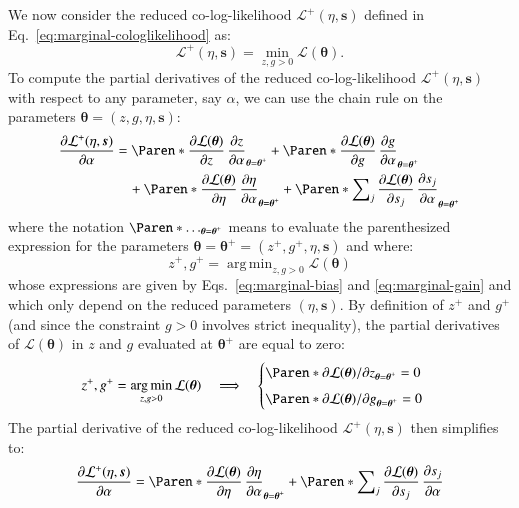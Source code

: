 \documentclass{aa}
\DeclareMathOperator*{\argmin}{arg\,min}
\newcommand*{\PDer}[2]{\frac{\partial#1}{\partial#2}}
\newcommand*{\V}[1]{\boldsymbol{#1}}   %
\newcommand*{\MC}[1]{\mathcal{#1}}
\newcommand*{\lkl}{\MC{L}}
\newcommand*{\lklplus}{\MC{L}^+}
\begin{document}
\begin{appendix}
We now consider the reduced co-log-likelihood
$\lklplus(\eta, \V s)$ defined in Eq.~\eqref{eq:marginal-cologlikelihood} as:
\begin{equation}
  \lklplus(\eta, \V s) = \min_{z,g > 0}\lkl(\V\theta).
\end{equation}
To compute the partial derivatives of the reduced co-log-likelihood
$\lklplus(\eta, \V s)$ with respect to any parameter, say $\alpha$, we can
use the chain rule on the parameters $\V\theta = (z, g, \eta, \V s)$:
\begin{align}
  \PDer{\lklplus(\eta, \V s)}{\alpha}
  &= \Paren*{
    \PDer{\lkl(\V\theta)}{z}\,\PDer{z}{\alpha}
  }_{\V\theta=\V\theta^+} + \Paren*{
    \PDer{\lkl(\V\theta)}{g}\,\PDer{g}{\alpha}
  }_{\V\theta=\V\theta^+}\notag\\
  &\quad+ \Paren*{
    \PDer{\lkl(\V\theta)}{\eta}\,\PDer{\eta}{\alpha}
  }_{\V\theta=\V\theta^+} +\Paren*{
    \sum\nolimits_{j}\PDer{\lkl(\V\theta)}{s_j}\,\PDer{s_j}{\alpha}
  }_{\V\theta=\V\theta^+}
\end{align}
where the notation $\Paren*{\ldots}_{\V\theta=\V\theta^+}$ means to evaluate the
parenthesized expression for the parameters $\V\theta = \V\theta^+ = (z^+, g^+,
\eta, \V s)$ and where:
\begin{equation}
  z^+, g^+ = \argmin_{z, g > 0} \lkl(\V\theta)
\end{equation}
whose expressions are given by Eqs.~\eqref{eq:marginal-bias} and
\eqref{eq:marginal-gain} and which only depend on the reduced parameters
$(\eta, \V s)$.  By definition of $z^+$ and $g^+$ (and since the constraint
$g>0$ involves strict inequality), the partial derivatives of $\lkl(\V\theta)$
in $z$ and $g$ evaluated at $\V\theta^+$ are equal to zero:
\begin{align}
  z^+, g^+ = \argmin_{z, g > 0} \lkl(\V\theta)
  \quad\Longrightarrow\quad
  \begin{cases}
  \Paren*{\partial\lkl(\V\theta)/\partial z}_{\V\theta=\V\theta^+} = 0\\[1ex]
  \Paren*{\partial\lkl(\V\theta)/\partial g}_{\V\theta=\V\theta^+} = 0\\
  \end{cases}
\end{align}
The partial derivative of the reduced co-log-likelihood $\lklplus(\eta, \V
s)$ then simplifies to:
\begin{equation}
  \PDer{\lklplus(\eta, \V s)}{\alpha}
  = \Paren*{
    \PDer{\lkl(\V\theta)}{\eta}\,\PDer{\eta}{\alpha}
  }_{\V\theta=\V\theta^+} + \Paren*{
    \sum\nolimits_{j}\PDer{\lkl(\V\theta)}{s_j}\,\PDer{s_j}{\alpha}
}
\end{equation}
\end{appendix}
\end{document}
